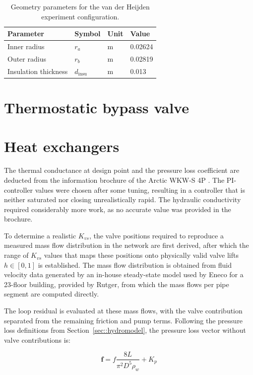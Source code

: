 \begin{table}[h!]
\centering
\caption{Geometry parameters for the van der Heijden experiment configuration.}
\label{tab:pipe_heijden_geometry}
\begin{tabular}{llll}
\hline
\textbf{Parameter} & \textbf{Symbol} & \textbf{Unit} & \textbf{Value} \\
\hline
Inner radius         & $r_a$  & m & 0.02624 \\
Outer radius         & $r_b$  & m & 0.02819 \\
Insulation thickness & $d_{\text{insu}}$     & m & 0.013   \\
\hline
\end{tabular}
\end{table}

\section{Thermostatic bypass valve}


\section{Heat exchangers}
The thermal conductance at design point and the pressure loss coefficient are 
deducted from the information brochure of the Arctic WKW-S 4P 
\cite{fortes_wkw_s_4p}. The PI-controller values were chosen after some tuning, resulting in a controller that is neither saturated nor closing unrealistically rapid. The hydraulic conductivity required considerably more work, as no accurate value was provided in the brochure.

To determine a realistic $K_{vs}$, the valve positions required to reproduce a 
measured mass flow distribution in the network are first derived, after which the range of $K_{vs}$ values that maps these positions onto physically valid valve lifts $h \in [0, 1]$ is established. The mass flow distribution is obtained from fluid velocity data generated by an in-house steady-state model used by Eneco for a 23-floor building, provided by Rutger, from which the mass flows per pipe segment are computed directly.

The loop residual is evaluated at these mass flows, with the valve contribution separated from the remaining friction and pump terms. Following the pressure loss definitions from Section~\ref{sec::hydromodel}, the pressure loss vector without valve contributions is:

\begin{equation}
    \mathbf{f} = f \frac{8L}{\pi^2 D^5 \rho_w} + K_p
\end{equation}


